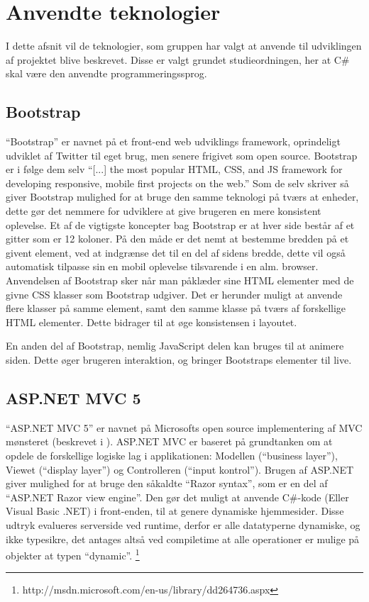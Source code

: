 \section{Anvendte teknologier}
I dette afsnit vil de teknologier, som gruppen har valgt at anvende til udviklingen af projektet blive beskrevet.
Disse er valgt grundet studieordningen, her at C\# skal være den anvendte programmeringssprog.
\subsection{Bootstrap}
``Bootstrap'' er navnet på et front-end web udviklings framework, oprindeligt udviklet af Twitter til eget brug, men senere frigivet som open source. 
Bootstrap er i følge dem selv ``[...] the most popular HTML, CSS, and JS framework for developing responsive, mobile first projects on the web.'' \cite{GETBOOTSTRAP}
Som de selv skriver så giver Bootstrap mulighed for at bruge den samme teknologi på tværs at enheder, dette gør det nemmere for udviklere at give brugeren en mere konsistent oplevelse.
Et af de vigtigste koncepter bag Bootstrap er at hver side består af et gitter som er 12 koloner. 
På den måde er det nemt at bestemme bredden på et givent element, ved at indgrænse det til en del af sidens bredde, dette vil også automatisk tilpasse sin en mobil oplevelse tilsvarende i en alm. browser. 
Anvendelsen af Bootstrap sker når man påklæder sine HTML elementer med de givne CSS klasser som Bootstrap udgiver. 
Det er herunder muligt at anvende flere klasser på samme element, samt den samme klasse på tværs af forskellige HTML elementer. 
Dette bidrager til at øge konsistensen i layoutet.

En anden del af Bootstrap, nemlig JavaScript delen kan bruges til at animere siden. 
Dette øger brugeren interaktion, og bringer Bootstraps elementer til live. \cite{GETBOOTSTRAP}

\subsection{ASP.NET MVC 5}
``ASP.NET MVC 5'' er navnet på Microsofts open source implementering af MVC mønsteret (beskrevet i ). 
ASP.NET MVC er baseret på grundtanken om at opdele de forskellige logiske lag i applikationen: Modellen (``business layer''), Viewet (``display layer'') og Controlleren (``input kontrol''). 
Brugen af ASP.NET giver mulighed for at bruge den såkaldte ``Razor syntax'', som er en del af ``ASP.NET Razor view engine''.
Den gør det muligt at anvende C\#-kode (Eller Visual Basic .NET) i front-enden, til at genere dynamiske hjemmesider. 
Disse udtryk evalueres serverside ved runtime, derfor er alle datatyperne dynamiske, og ikke typesikre, det antages altså ved compiletime at alle operationer er mulige på objekter at typen ``dynamic''. \footnote{http://msdn.microsoft.com/en-us/library/dd264736.aspx}

